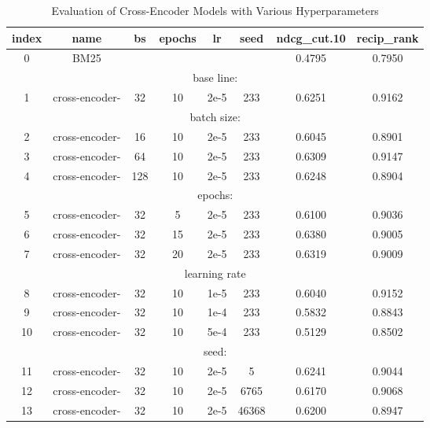 \begin{table}[h!]
    \centering
    \begin{tabular}{|c|c|c|c|c|c|c|c|}
        \hline
        index & name & bs & epochs & lr & seed & ndcg\_cut.10 & recip\_rank \\
        \hline
        0 & BM25 & & & & & 0.4795 & 0.7950 \\
        \hline
        \multicolumn{8}{|c|}{base line:} \\
        \hline
        1 & cross-encoder- & 32 & 10 & 2e-5 & 233 & 0.6251 & 0.9162 \\
        \hline
        \multicolumn{8}{|c|}{batch size:} \\
        \hline
        2 & cross-encoder- & 16 & 10 & 2e-5 & 233 & 0.6045 & 0.8901 \\
        3 & cross-encoder- & 64 & 10 & 2e-5 & 233 & 0.6309 & 0.9147 \\
        4 & cross-encoder- & 128 & 10 & 2e-5 & 233 & 0.6248 & 0.8904 \\
        \hline
        \multicolumn{8}{|c|}{epochs:} \\
        \hline
        5 & cross-encoder- & 32 & 5 & 2e-5 & 233 & 0.6100 & 0.9036 \\
        6 & cross-encoder- & 32 & 15 & 2e-5 & 233 & 0.6380 & 0.9005 \\
        7 & cross-encoder- & 32 & 20 & 2e-5 & 233 & 0.6319 & 0.9009 \\
        \hline
        \multicolumn{8}{|c|}{learning rate} \\
        \hline
        8 & cross-encoder- & 32 & 10 & 1e-5 & 233 & 0.6040 & 0.9152 \\
        9 & cross-encoder- & 32 & 10 & 1e-4 & 233 & 0.5832 & 0.8843 \\
        10 & cross-encoder- & 32 & 10 & 5e-4 & 233 & 0.5129 & 0.8502 \\
        \hline
        \multicolumn{8}{|c|}{seed:} \\
        \hline
        11 & cross-encoder- & 32 & 10 & 2e-5 & 5 & 0.6241 & 0.9044 \\
        12 & cross-encoder- & 32 & 10 & 2e-5 & 6765 & 0.6170 & 0.9068 \\
        13 & cross-encoder- & 32 & 10 & 2e-5 & 46368 & 0.6200 & 0.8947 \\
        \hline
    \end{tabular}
    \caption{Evaluation of Cross-Encoder Models with Various Hyperparameters}
    \label{table:cross_encoder}
\end{table}


